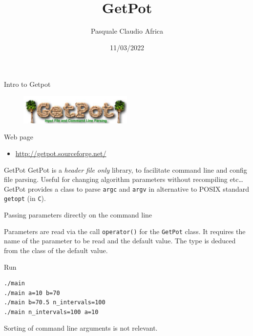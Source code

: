 \documentclass[10pt]{beamer}
\begin{document}
    \title{GetPot}
    \author{Pasquale Claudio Africa}
    \date{11/03/2022}

\begin{frame}
    \maketitle
\end{frame}

\begin{frame}{Intro to Getpot}
    \begin{figure}
        \centering
        \includegraphics[width=0.5\textwidth]{images/GetPot_logo.jpg}
    \end{figure}

    \begin{block}{Web page}
        \centering
        \begin{itemize}
            \item \url{http://getpot.sourceforge.net/}
        \end{itemize}
    \end{block}
\end{frame}

\begin{frame}{GetPot}
    GetPot is a \emph{header file only} library,
    to facilitate command line and config file parsing.
    Useful for changing algorithm parameters without recompiling
     etc\ldots\\[1cm]

    GetPot provides a class to parse \texttt{argc} and \texttt{argv}
    in alternative to POSIX standard \texttt{getopt} (in \texttt{C}).
\end{frame}

\begin{frame}[fragile]{Passing parameters directly on the command line}

    

    Parameters are read via the call \texttt{operator()} for the \texttt{GetPot} class.
    It requires the name of the parameter to be read and the default value.
    The type is deduced from the class of the default value.
\end{frame}

\begin{frame}[fragile]{Run}
    \begin{verbatim}
./main
./main a=10 b=70
./main b=70.5 n_intervals=100
./main n_intervals=100 a=10
    \end{verbatim}

    \vspace{1cm}
    
   	Sorting of command line arguments is not relevant.
\end{frame}
\end{document}
